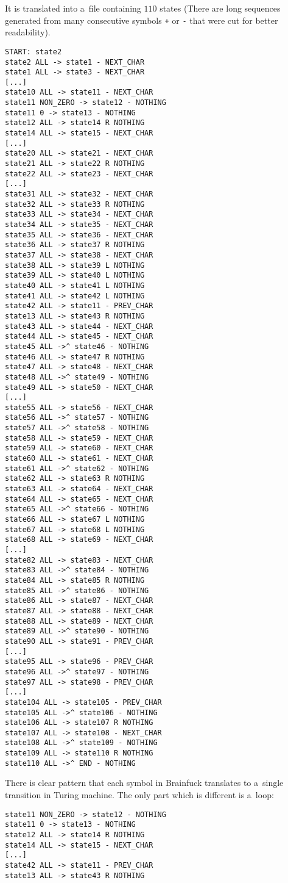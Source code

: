 \documentclass[english,shortabstract,mgr]{iithesis}
\begin{document}
It is translated into a~file containing $110$ states (There are long
sequences generated from many consecutive symbols \texttt{+} or \texttt{-} that
were cut for better readability).
{
 \fontsize{9pt}{12pt}\selectfont
\begin{verbatim}
START: state2
state2 ALL -> state1 - NEXT_CHAR
state1 ALL -> state3 - NEXT_CHAR
[...]
state10 ALL -> state11 - NEXT_CHAR
state11 NON_ZERO -> state12 - NOTHING
state11 0 -> state13 - NOTHING
state12 ALL -> state14 R NOTHING
state14 ALL -> state15 - NEXT_CHAR
[...]
state20 ALL -> state21 - NEXT_CHAR
state21 ALL -> state22 R NOTHING
state22 ALL -> state23 - NEXT_CHAR
[...]
state31 ALL -> state32 - NEXT_CHAR
state32 ALL -> state33 R NOTHING
state33 ALL -> state34 - NEXT_CHAR
state34 ALL -> state35 - NEXT_CHAR
state35 ALL -> state36 - NEXT_CHAR
state36 ALL -> state37 R NOTHING
state37 ALL -> state38 - NEXT_CHAR
state38 ALL -> state39 L NOTHING
state39 ALL -> state40 L NOTHING
state40 ALL -> state41 L NOTHING
state41 ALL -> state42 L NOTHING
state42 ALL -> state11 - PREV_CHAR
state13 ALL -> state43 R NOTHING
state43 ALL -> state44 - NEXT_CHAR
state44 ALL -> state45 - NEXT_CHAR
state45 ALL ->^ state46 - NOTHING
state46 ALL -> state47 R NOTHING
state47 ALL -> state48 - NEXT_CHAR
state48 ALL ->^ state49 - NOTHING
state49 ALL -> state50 - NEXT_CHAR
[...]
state55 ALL -> state56 - NEXT_CHAR
state56 ALL ->^ state57 - NOTHING
state57 ALL ->^ state58 - NOTHING
state58 ALL -> state59 - NEXT_CHAR
state59 ALL -> state60 - NEXT_CHAR
state60 ALL -> state61 - NEXT_CHAR
state61 ALL ->^ state62 - NOTHING
state62 ALL -> state63 R NOTHING
state63 ALL -> state64 - NEXT_CHAR
state64 ALL -> state65 - NEXT_CHAR
state65 ALL ->^ state66 - NOTHING
state66 ALL -> state67 L NOTHING
state67 ALL -> state68 L NOTHING
state68 ALL -> state69 - NEXT_CHAR
[...]
state82 ALL -> state83 - NEXT_CHAR
state83 ALL ->^ state84 - NOTHING
state84 ALL -> state85 R NOTHING
state85 ALL ->^ state86 - NOTHING
state86 ALL -> state87 - NEXT_CHAR
state87 ALL -> state88 - NEXT_CHAR
state88 ALL -> state89 - NEXT_CHAR
state89 ALL ->^ state90 - NOTHING
state90 ALL -> state91 - PREV_CHAR
[...]
state95 ALL -> state96 - PREV_CHAR
state96 ALL ->^ state97 - NOTHING
state97 ALL -> state98 - PREV_CHAR
[...]
state104 ALL -> state105 - PREV_CHAR
state105 ALL ->^ state106 - NOTHING
state106 ALL -> state107 R NOTHING
state107 ALL -> state108 - NEXT_CHAR
state108 ALL ->^ state109 - NOTHING
state109 ALL -> state110 R NOTHING
state110 ALL ->^ END - NOTHING
\end{verbatim}
}

There is clear pattern that each symbol in Brainfuck translates
to a~single transition in Turing machine. The only part which is different
is a~loop:
\begin{verbatim}
state11 NON_ZERO -> state12 - NOTHING
state11 0 -> state13 - NOTHING
state12 ALL -> state14 R NOTHING
state14 ALL -> state15 - NEXT_CHAR
[...]
state42 ALL -> state11 - PREV_CHAR
state13 ALL -> state43 R NOTHING
\end{verbatim}
\end{document}
